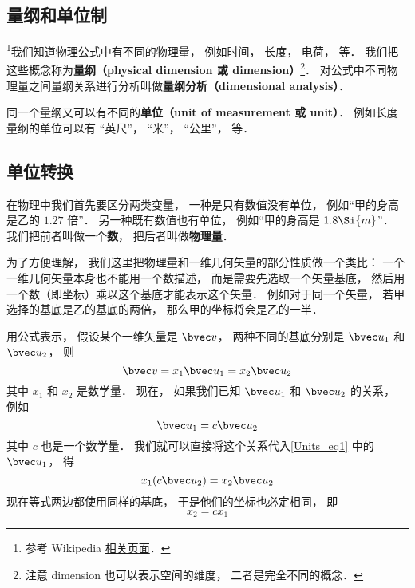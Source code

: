 
\subsection{量纲和单位制}
\footnote{参考 Wikipedia \href{https://en.wikipedia.org/wiki/Dimensional_analysis}{相关页面}．}我们知道物理公式中有不同的物理量， 例如时间， 长度， 电荷， 等． 我们把这些概念称为\textbf{量纲（physical dimension 或 dimension）}\footnote{注意 dimension 也可以表示空间的维度， 二者是完全不同的概念．}． 对公式中不同物理量之间量纲关系进行分析叫做\textbf{量纲分析（dimensional analysis）}．

同一个量纲又可以有不同的\textbf{单位（unit of measurement 或 unit）}． 例如长度量纲的单位可以有 “英尺”， “米”， “公里”， 等．

\subsection{单位转换}


在物理中我们首先要区分两类变量， 一种是只有数值没有单位， 例如“甲的身高是乙的 $1.27$ 倍”． 另一种既有数值也有单位， 例如“甲的身高是 $1.8\Si{m}$”． 我们把前者叫做一个\textbf{数}， 把后者叫做\textbf{物理量}．

为了方便理解， 我们这里把物理量和一维几何矢量的部分性质做一个类比： 一个一维几何矢量本身也不能用一个数描述， 而是需要先选取一个矢量基底， 然后用一个数（即坐标）乘以这个基底才能表示这个矢量． 例如对于同一个矢量， 若甲选择的基底是乙的基底的两倍， 那么甲的坐标将会是乙的一半．

用公式表示， 假设某个一维矢量是 $\bvec v$， 两种不同的基底分别是 $\bvec u_1$ 和 $\bvec u_2$， 则
\begin{equation}\label{Units_eq1}
\bvec v = x_1 \bvec u_1 = x_2 \bvec u_2
\end{equation}
其中 $x_1$ 和 $x_2$ 是数学量． 现在， 如果我们已知 $\bvec u_1$ 和 $\bvec u_2$ 的关系， 例如
\begin{equation}\label{Units_eq2}
\bvec u_1 = c \bvec u_2
\end{equation}
其中 $c$ 也是一个数学量． 我们就可以直接将这个关系代入\autoref{Units_eq1} 中的 $\bvec u_1$， 得
\begin{equation}
x_1 (c \bvec u_2) = x_2 \bvec u_2
\end{equation}
现在等式两边都使用同样的基底， 于是他们的坐标也必定相同， 即
\begin{equation}
x_2 = c x_1
\end{equation}

